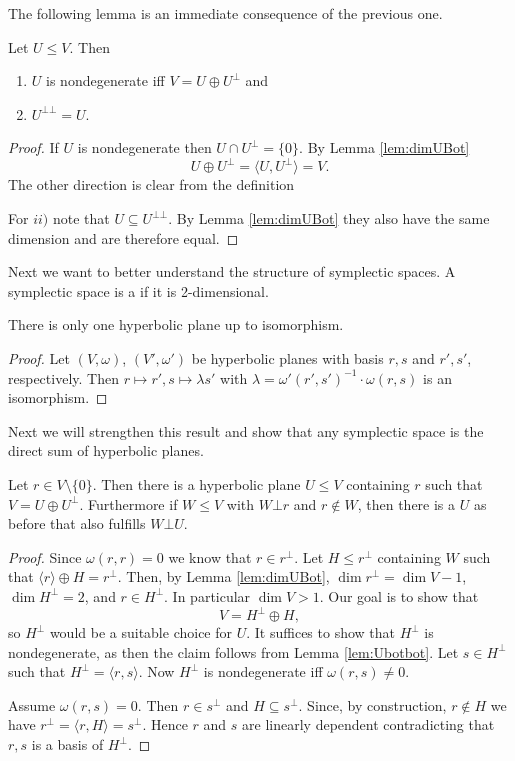 The following lemma is an immediate consequence of the previous one.
\begin{lemma}\label{lem:Ubotbot}
Let $U\leq V$. Then
\begin{enumerate}[label=\roman{*})]
\item $U$ is nondegenerate iff $V=U\oplus U^\bot$ and
\item $U^{\bot\bot}=U$.
\end{enumerate}
\end{lemma}
\begin{proof}
If $U$ is nondegenerate then $U\cap U^\bot=\{0\}$. By Lemma \ref{lem:dimUBot} \[U\oplus U^\bot=\langle U,U^\bot\rangle=V.\]
The other direction is clear from the definition

For $ii)$ note that $U\subseteq U^{\bot\bot}$. By Lemma \ref{lem:dimUBot} they also have the same dimension and are therefore equal.
\end{proof}

Next we want to better understand the structure of symplectic spaces. 
A symplectic space is a  if it is 2-dimensional.


\begin{lemma}\label{lem:oneHypPlane}
There is only one hyperbolic plane up to isomorphism.
\end{lemma}
\begin{proof}
Let $(V,\omega)$, $(V',\omega')$ be hyperbolic planes with basis $r,s$ and $r',s'$, respectively. 
Then $r\mapsto r', s\mapsto \lambda s'$ with $\lambda=\omega'(r',s')^{-1}\cdot\omega(r,s)$ is an isomorphism. 
\end{proof}
Next we will strengthen this result and show that any symplectic space is the direct sum of hyperbolic planes.

\begin{theorem}\label{thm:hypDecomp}
Let $r\in V\setminus\{0\}$. Then there is a hyperbolic plane $U\leq V$ containing $r$ such that $V=U\oplus U^\bot$. Furthermore if $W\leq V$ with $W\bot r$ and $r\notin W$, then there is a $U$ as before that also fulfills $W\bot U$.
\end{theorem}
\begin{proof}
Since $\omega(r,r)=0$ we know that $r\in r^\bot$. Let $H\leq r^\bot$ containing $W$ such that $\langle r\rangle\oplus H=r^\bot$. Then, by Lemma \ref{lem:dimUBot}, $\dim r^\bot=\dim V-1$, $\dim H^\bot=2$, and $r\in H^\bot$. In particular $\dim V>1$.
Our goal is to show that \[V=H^\bot\oplus H,\] so $H^\bot$ would be a suitable choice for $U$.
It suffices to show that $H^\bot$ is nondegenerate, as then the claim follows from Lemma \ref{lem:Ubotbot}. Let $s\in H^\bot$ such that $H^\bot=\langle r,s\rangle$. Now $H^\bot$ is nondegenerate iff $\omega(r,s)\not=0$. 

Assume $\omega(r,s)=0$. Then $r\in s^\bot$ and $H\subseteq s^\bot$. Since, by construction, $r\notin H$ we have $r^\bot=\langle r,H\rangle=s^\bot$. Hence $r$ and $s$ are linearly dependent contradicting that $r,s$ is a basis of $H^\bot$.

\end{proof}

